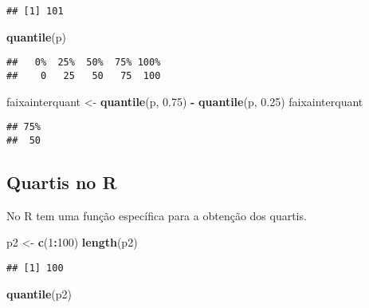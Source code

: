 \documentclass[
]{book}
\newenvironment{Shaded}{\begin{snugshade}}{\end{snugshade}}
\newcommand{\DecValTok}[1]{\textcolor[rgb]{0.00,0.00,0.81}{#1}}
\newcommand{\FloatTok}[1]{\textcolor[rgb]{0.00,0.00,0.81}{#1}}
\newcommand{\KeywordTok}[1]{\textcolor[rgb]{0.13,0.29,0.53}{\textbf{#1}}}
\newcommand{\NormalTok}[1]{#1}
\newcommand{\OperatorTok}[1]{\textcolor[rgb]{0.81,0.36,0.00}{\textbf{#1}}}
\newcommand{\StringTok}[1]{\textcolor[rgb]{0.31,0.60,0.02}{#1}}
\begin{document}
\begin{verbatim}
## [1] 101
\end{verbatim}

\begin{Shaded}
\begin{Highlighting}[]
\KeywordTok{quantile}\NormalTok{(p)}
\end{Highlighting}
\end{Shaded}

\begin{verbatim}
##   0%  25%  50%  75% 100% 
##    0   25   50   75  100
\end{verbatim}

\begin{Shaded}
\begin{Highlighting}[]
\NormalTok{faixainterquant <-}\StringTok{ }\KeywordTok{quantile}\NormalTok{(p, }\FloatTok{0.75}\NormalTok{) }\OperatorTok{-}\StringTok{ }\KeywordTok{quantile}\NormalTok{(p, }
    \FloatTok{0.25}\NormalTok{)}
\NormalTok{faixainterquant}
\end{Highlighting}
\end{Shaded}

\begin{verbatim}
## 75% 
##  50
\end{verbatim}

\hypertarget{quartis-no-r-1}{%
\subsection{Quartis no R}\label{quartis-no-r-1}}

No R tem uma função específica para a obtenção dos quartis.

\begin{Shaded}
\begin{Highlighting}[]
\NormalTok{p2 <-}\StringTok{ }\KeywordTok{c}\NormalTok{(}\DecValTok{1}\OperatorTok{:}\DecValTok{100}\NormalTok{)}
\KeywordTok{length}\NormalTok{(p2)}
\end{Highlighting}
\end{Shaded}

\begin{verbatim}
## [1] 100
\end{verbatim}

\begin{Shaded}
\begin{Highlighting}[]
\KeywordTok{quantile}\NormalTok{(p2)}
\end{Highlighting}
\end{Shaded}
\end{document}
